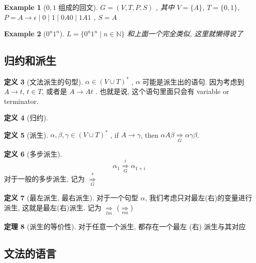 \documentclass[12pt]{ctexart}
\theoremstyle{definition}
\theoremstyle{definition}
\newtheorem{definition}{定义}[section]
\newtheorem{thm}[definition]{定理}
\theoremstyle{plain}
\newtheorem{exam}[definition]{Example}
\theoremstyle{remark}
\begin{document}
\begin{exam}[\(0,1\) 组成的回文]
	\(G = (V , T , P , S ) \) , 其中 \(V = \{ A \} \), \(T = \{ 0 , 1 \} \), \(P = A \to \epsilon \mid 0 \mid 1\mid  0A 0 \mid 1 A1\) , \(S = A\)
\end{exam}
\begin{exam}[\(0 ^{n}1 ^{n}\)]
	\(L = \{  0 ^{ n} 1 ^{n} \mid n \in \mathbb{N} \} \)
	和上面一个完全类似, 这里就懒得说了
\end{exam}

\subsection{归约和派生}
\begin{definition}[文法派生的句型]
\(\alpha \in (V \cup T ) ^{*} \) , \(\alpha\) 可能是派生出的语句. 
因为考虑到 \(A \to t\), \(t \in T\), 或者是 \(A \to A t \) . 也就是说, 这个语句里面只会有 variable or terminator.
\end{definition}

\begin{definition}[归约]
\end{definition}

\begin{definition}[派生]
	\(\alpha ,\beta , \gamma \in (V \cup T ) ^{*}\) , if \(A \to \gamma\), then \( \alpha A\beta \underset{G}{\Rightarrow}\alpha \gamma\beta\). 
\end{definition}

\begin{definition}[多步派生]
	\begin{equation}
		\alpha_{1} \overset{i}{\underset{G}{\Rightarrow}} \alpha _{1 + i}
	\end{equation}
	对于一般的多步派生, 记为 \(\overset{*}{\underset{G}{\Rightarrow}}\)
\end{definition}

\begin{definition}[最左派生, 最右派生]
	对于一个句型 \(\alpha\), 我们考虑只对最左(右)的变量进行派生, 这就是最左(右)派生. 记为 \(\underset{lm}{\Rightarrow}\) (\(\underset{rm}{\Rightarrow}\))
\end{definition}
\begin{thm}[派生的等价性]
对于任意一个派生, 都存在一个最左 (右) 派生与其对应
\end{thm}

\subsection{文法的语言}
\end{document}
